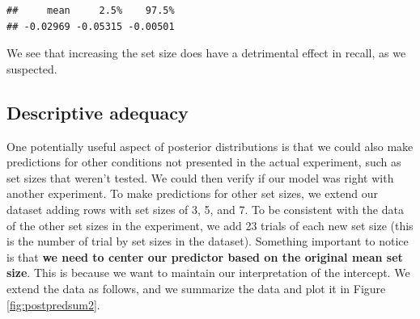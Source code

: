 \documentclass[12pt,]{krantz}
\newenvironment{Shaded}{\begin{snugshade}}{\end{snugshade}}
\newcommand{\KeywordTok}[1]{\textcolor[rgb]{0.13,0.29,0.53}{\textbf{#1}}}
\newcommand{\DataTypeTok}[1]{\textcolor[rgb]{0.13,0.29,0.53}{#1}}
\newcommand{\DecValTok}[1]{\textcolor[rgb]{0.00,0.00,0.81}{#1}}
\newcommand{\StringTok}[1]{\textcolor[rgb]{0.31,0.60,0.02}{#1}}
\newcommand{\ControlFlowTok}[1]{\textcolor[rgb]{0.13,0.29,0.53}{\textbf{#1}}}
\newcommand{\OperatorTok}[1]{\textcolor[rgb]{0.81,0.36,0.00}{\textbf{#1}}}
\newcommand{\NormalTok}[1]{#1}
\theoremstyle{definition}
\theoremstyle{definition}
\theoremstyle{definition}
\theoremstyle{remark}
\begin{document}
\begin{verbatim}
##     mean     2.5%    97.5% 
## -0.02969 -0.05315 -0.00501
\end{verbatim}

We see that increasing the set size does have a detrimental effect in
recall, as we suspected.

\subsection{Descriptive adequacy}\label{descriptive-adequacy}

One potentially useful aspect of posterior distributions is that we
could also make predictions for other conditions not presented in the
actual experiment, such as set sizes that weren't tested. We could then
verify if our model was right with another experiment. To make
predictions for other set sizes, we extend our dataset adding rows with
set sizes of 3, 5, and 7. To be consistent with the data of the other
set sizes in the experiment, we add 23 trials of each new set size (this
is the number of trial by set sizes in the dataset). Something important
to notice is that \textbf{we need to center our predictor based on the
original mean set size}. This is because we want to maintain our
interpretation of the intercept. We extend the data as follows, and we
summarize the data and plot it in Figure \ref{fig:postpredsum2}.

\begin{Shaded}
\end{Shaded}
\end{document}
